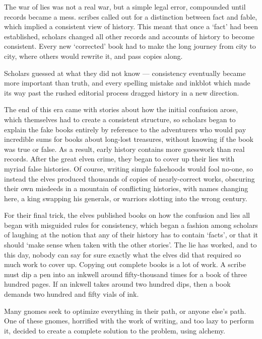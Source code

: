 
\begin{exampletext}
  \ifcase\value{r6}\relax\or
    The war of lies was not a real war, but a simple legal error, compounded until records became a mess.
    \Glspl{scribe} called out for a distinction between fact and fable, which implied a consistent view of history.
    This meant that once a `fact' had been established, scholars changed all other records and accounts of history to become consistent.
    Every new `corrected' book had to make the long journey from city to city, where others would rewrite it, and pass copies along.

    Scholars guessed at what they did not know --- consistency eventually became more important than truth, and every spelling mistake and inkblot which made its way past the rushed editorial process dragged history in a new direction.

    The end of this era came with stories about how the initial confusion arose, which themselves had to create a consistent structure, so scholars began to explain the fake books entirely by reference to the adventurers who would pay incredible sums for books about long-lost treasures, without knowing if the book was true or false.
    As a result, early history contains more guesswork than real records.
  \or
    After the great elven crime, they began to cover up their lies with myriad false histories.
    Of course, writing simple falsehoods would fool no-one, so instead the elves produced thousands of copies of nearly-correct works, obscuring their own misdeeds in a mountain of conflicting histories, with names changing here, a king swapping his generals, or warriors slotting into the wrong century.

    For their final trick, the elves published books on how the confusion and lies all began with misguided rules for consistency, which began a fashion among scholars of laughing at the notion that any of their history has to contain `facts', or that it should `make sense when taken with the other stories'.
    The lie has worked, and to this day, nobody can say for sure exactly what the elves did that required so much work to cover up.
  \or
    Copying out complete books is a lot of work.
    A scribe must dip a pen into an inkwell around fifty-thousand times for a book of three hundred pages.
    If an inkwell takes around two hundred dips, then a book demands two hundred and fifty vials of ink.

    Many gnomes seek to optimize everything in their path, or anyone else's path.
    One of these gnomes, horrified with the work of writing, and too lazy to perform it, decided to create a complete solution to the problem, using alchemy.


\end{exampletext}
